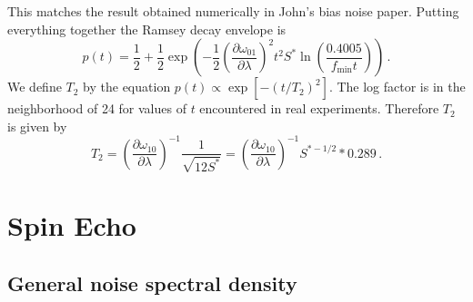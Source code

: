 \documentclass{article}
\begin{document}
This matches the result obtained numerically in John's bias noise
paper.
Putting everything together the Ramsey decay envelope is
\begin{equation}
p(t) = \frac{1}{2} + \frac{1}{2} \exp \left( -\frac{1}{2} \left( \frac{\partial\omega_{01}}{\partial\lambda} \right)^2 t^2 S^* \ln\left(\frac{0.4005}{f_{\textrm{min}} t} \right) \right) \, .
\end{equation}
We define $T_2$ by the equation $p(t)\propto\exp\left[-(t/T_{2})^{2}\right]$.
The log factor is in the neighborhood of 24 for values of $t$ encountered
in real experiments.
Therefore $T_2$ is given by
\begin{equation}
T_2 = \left( \frac{\partial\omega_{10}}{\partial\lambda} \right)^{-1} \frac{1}{\sqrt{12S^{*}}} = \left( \frac{\partial\omega_{10}}{\partial\lambda} \right)^{-1} S^{*-1/2} * 0.289 \, .
\end{equation}


\section{Spin Echo}

\subsection{General noise spectral density}
\end{document}
